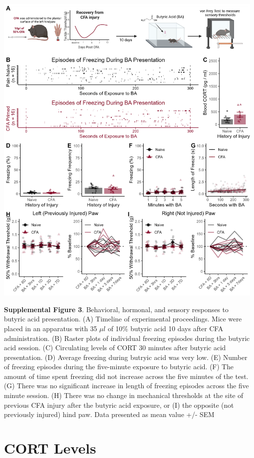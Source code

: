 \documentclass[
]{book}
\begin{document}
\includegraphics[width=33.33in]{Figs/S3_BA_Panel}

\textbf{Supplemental Figure 3}. Behavioral, hormonal, and sensory responses to butyric acid presentation. (A) Timeline of experimental proceedings. Mice were placed in an apparatus with 35 \(\mu l\) of 10\% butyric acid 10 days after CFA administration. (B) Raster plots of individual freezing episodes during the butyric acid session. (C) Circulating levels of CORT 30 minutes after butyric acid presentation. (D) Average freezing during butryic acid was very low. (E) Number of freezing episodes during the five-minute exposure to butyric acid. (F) The amount of time spent freezing did not increase across the five minutes of the test. (G) There was no significant increase in length of freezing episodes across the five minute session. (H) There was no change in mechanical thresholds at the site of previous CFA injury after the butyric acid exposure, or (I) the opposite (not previously injured) hind paw. Data presented as mean value +/- SEM

\section*{CORT Levels}\label{cort-levels}
\end{document}
